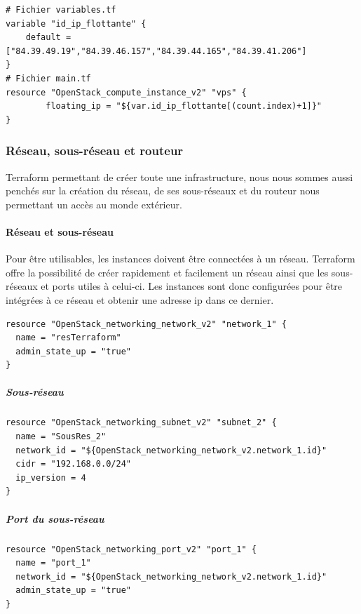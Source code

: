 \documentclass[]{article}
\let\oldparagraph\paragraph
\renewcommand{\paragraph}[1]{\oldparagraph{#1}\mbox{}}
\let\oldsubparagraph\subparagraph
\renewcommand{\subparagraph}[1]{\oldsubparagraph{#1}\mbox{}}
\begin{document}
\begin{verbatim}
# Fichier variables.tf
variable "id_ip_flottante" {
    default = ["84.39.49.19","84.39.46.157","84.39.44.165","84.39.41.206"]
}
# Fichier main.tf
resource "OpenStack_compute_instance_v2" "vps" {
        floating_ip = "${var.id_ip_flottante[(count.index)+1]}"
}
\end{verbatim}

\subsubsection{Réseau, sous-réseau et
routeur}\label{ruxe9seau-sous-ruxe9seau-et-routeur}
Terraform permettant de créer toute une infrastructure, nous nous sommes
aussi penchés sur la création du réseau, de ses sous-réseaux et du
routeur nous permettant un accès au monde extérieur.

\paragraph{Réseau et sous-réseau}\label{ruxe9seau-et-sous-ruxe9seau}
Pour être utilisables, les instances doivent être connectées à un réseau.
Terraform offre la possibilité de créer rapidement et facilement un
réseau ainsi que les sous-réseaux et ports utiles à celui-ci. Les
instances sont donc configurées pour être intégrées à ce réseau et
obtenir une adresse ip dans ce dernier. 

\begin{verbatim}
resource "OpenStack_networking_network_v2" "network_1" {
  name = "resTerraform"
  admin_state_up = "true"
}

\end{verbatim}
\subparagraph{Sous-réseau}\label{sous-ruxe9seau}
\begin{verbatim}
resource "OpenStack_networking_subnet_v2" "subnet_2" {
  name = "SousRes_2"
  network_id = "${OpenStack_networking_network_v2.network_1.id}"
  cidr = "192.168.0.0/24"
  ip_version = 4 
}
\end{verbatim}

\subparagraph{Port du sous-réseau}\label{port-du-sous-ruxe9seau}
\begin{verbatim}
resource "OpenStack_networking_port_v2" "port_1" {
  name = "port_1"
  network_id = "${OpenStack_networking_network_v2.network_1.id}"
  admin_state_up = "true"
}
\end{verbatim}
\end{document}
